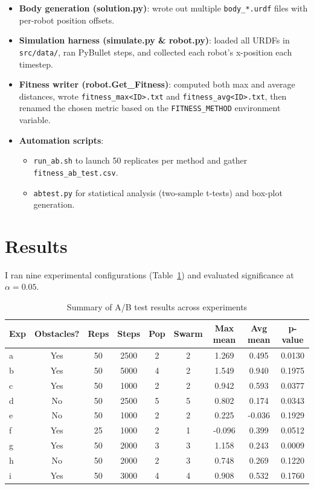 \documentclass[12pt]{article}
\begin{document}
\begin{itemize}
  \item \textbf{Body generation (solution.py)}: wrote out multiple \texttt{body\_*.urdf} files with per-robot position offsets.
  \item \textbf{Simulation harness (simulate.py \& robot.py)}: loaded all URDFs in \texttt{src/data/}, ran PyBullet steps, and collected each robot’s x-position each timestep.
  \item \textbf{Fitness writer (robot.Get\_Fitness)}: computed both max and average distances, wrote \texttt{fitness\_max<ID>.txt} and \texttt{fitness\_avg<ID>.txt}, then renamed the chosen metric based on the \texttt{FITNESS\_METHOD} environment variable.
  \item \textbf{Automation scripts}:
    \begin{itemize}
      \item \texttt{run\_ab.sh} to launch 50 replicates per method and gather \texttt{fitness\_ab\_test.csv}.
      \item \texttt{abtest.py} for statistical analysis (two-sample t-tests) and box-plot generation.
    \end{itemize}
\end{itemize}


\section{Results}
I ran nine experimental configurations (Table~\ref{tab:ab_results}) and evaluated significance at $\alpha = 0.05$.  

\begin{table}[H]
  \centering
  \caption{Summary of A/B test results across experiments}
  \label{tab:ab_results}
  \begin{tabular}{@{}lcccccccc@{}}
    \toprule
    Exp & Obstacles? & Reps & Steps & Pop & Swarm & Max mean & Avg mean & p-value \\
    \midrule
    a & Yes & 50 & 2500 & 2 & 2 & 1.269 & 0.495 & 0.0130 \\
    b & Yes & 50 & 5000 & 4 & 2 & 1.549 & 0.940 & 0.1975 \\
    c & Yes & 50 & 1000 & 2 & 2 & 0.942 & 0.593 & 0.0377 \\
    d & No  & 50 & 2500 & 5 & 5 & 0.802 & 0.174 & 0.0343 \\
    e & No  & 50 & 1000 & 2 & 2 & 0.225 & -0.036 & 0.1929 \\
    f & Yes & 25 & 1000 & 2 & 1 & -0.096 & 0.399 & 0.0512 \\
    g & Yes & 50 & 2000 & 3 & 3 & 1.158 & 0.243 & 0.0009 \\
    h & No  & 50 & 2000 & 2 & 3 & 0.748 & 0.269 & 0.1220 \\
    i & Yes & 50 & 3000 & 4 & 4 & 0.908 & 0.532 & 0.1760 \\
    \bottomrule
  \end{tabular}
\end{table}
\end{document}
